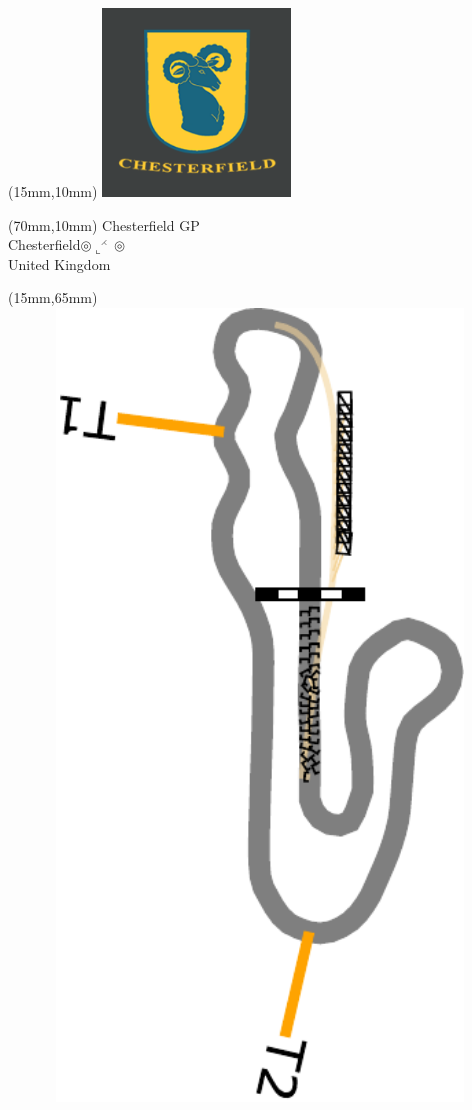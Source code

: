 \null\newpage
\begin{textblock*}{50mm}(15mm,10mm)%
\includegraphics[width=50mm]{LG/2015-06-23_00001.png}
\end{textblock*}
\begin{textblock*}{130mm}(70mm,10mm)%
{\fontsize{20}{20}\selectfont Chesterfield GP\\}
{\fontsize{16}{16}\selectfont Chesterfield\hfill $\circledcirc\llcorner^{\rightthreetimes}\circledcirc$\\}
{\fontsize{12}{12}\selectfont United Kingdom\\}
\end{textblock*}
\begin{textblock*}{185mm}(15mm,65mm)%
\centering
\mbox{\includegraphics[width=185mm,height=210mm,keepaspectratio]{PT/CFGP.pdf}}
\end{textblock*}
